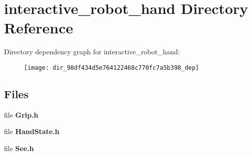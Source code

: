 \section{interactive\-\_\-robot\-\_\-hand Directory Reference}
\label{dir_98df434d5e764122468c770fc7a5b398}
Directory dependency graph for interactive\-\_\-robot\-\_\-hand\-:
\nopagebreak
\begin{figure}[H]
\begin{center}
\leavevmode
\texttt{[image: dir\_98df434d5e764122468c770fc7a5b398\_dep]}
\end{center}
\end{figure}
\subsection*{Files}
\begin{DoxyCompactItemize}
\item 
file {\bf Grip.\-h}
\item 
file {\bf Hand\-State.\-h}
\item 
file {\bf See.\-h}
\end{DoxyCompactItemize}
